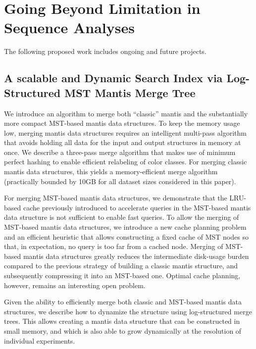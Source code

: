 
\chapter{Going Beyond Limitation in Sequence Analyses}

The following proposed work includes ongoing and future projects.

\section{A scalable and Dynamic Search Index via Log-Structured MST Mantis Merge Tree}
We introduce an algorithm to merge both “classic” mantis
and the substantially more compact MST-based mantis data structures.
To keep the memory usage low, merging mantis data structures requires
an intelligent multi-pass algorithm that avoids holding all data for the input
and output structures in memory at once.
We describe a three-pass merge algorithm that makes use of minimum perfect hashing
to enable efficient relabeling of color classes.
For merging classic mantis data structures, this yields a memory-efficient merge algorithm
(practically bounded by 10GB for all dataset sizes considered in this paper).

For merging MST-based mantis data structures,
we demonstrate that the LRU-based cache previously introduced to accelerate queries
in the MST-based mantis data structure is not sufficient to enable fast queries.
To allow the merging of MST-based mantis data structures,
we introduce a new cache planning problem and an efficient heuristic
that allows constructing a fixed cache of MST nodes so that, in expectation,
no query is too far from a cached node.
Merging of MST-based mantis data structures greatly reduces the intermediate disk-usage burden
compared to the previous strategy of building a classic mantis structure,
and subsequently compressing it into an MST-based one. Optimal cache planning,
however, remains an interesting open problem.

Given the ability to efficiently merge both classic and MST-based mantis data structures,
we describe how to dynamize the structure using log-structured merge trees.
This allows creating a mantis data structure that can be constructed in small memory,
and which is also able to grow dynamically at the resolution of individual experiments.



